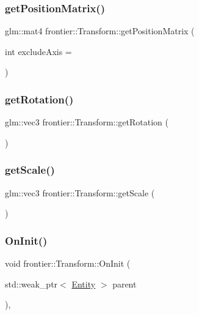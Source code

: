\subsubsection{\texorpdfstring{get\+Position\+Matrix()}{getPositionMatrix()}}
{\footnotesize\ttfamily glm\+::mat4 frontier\+::\+Transform\+::get\+Position\+Matrix (\begin{DoxyParamCaption}\item[{int}]{exclude\+Axis = {} }\end{DoxyParamCaption})}

\mbox{\label{classfrontier_1_1_transform_acb29cc4c641aa3ef6bed100b0bb96145}} 
\subsubsection{\texorpdfstring{get\+Rotation()}{getRotation()}}
{\footnotesize\ttfamily glm\+::vec3 frontier\+::\+Transform\+::get\+Rotation (\begin{DoxyParamCaption}{ }\end{DoxyParamCaption})}

\mbox{\label{classfrontier_1_1_transform_ae4e4e3f8fa4699d04d11a1a8eae8aff2}} 
\subsubsection{\texorpdfstring{get\+Scale()}{getScale()}}
{\footnotesize\ttfamily glm\+::vec3 frontier\+::\+Transform\+::get\+Scale (\begin{DoxyParamCaption}{ }\end{DoxyParamCaption})}

\mbox{\label{classfrontier_1_1_transform_a4fef98c5ccbe2bb6303714c7da2ba4ef}} 
\subsubsection{\texorpdfstring{On\+Init()}{OnInit()}\hspace{0.1cm}{\footnotesize\ttfamily [1/4]}}
{\footnotesize\ttfamily void frontier\+::\+Transform\+::\+On\+Init (\begin{DoxyParamCaption}\item[{std\+::weak\+\_\+ptr$<$ \hyperlink{classfrontier_1_1_entity}{Entity} $>$}]{parent }\end{DoxyParamCaption})\hspace{0.3cm}{\ttfamily [override]}, {\ttfamily [virtual]}}



